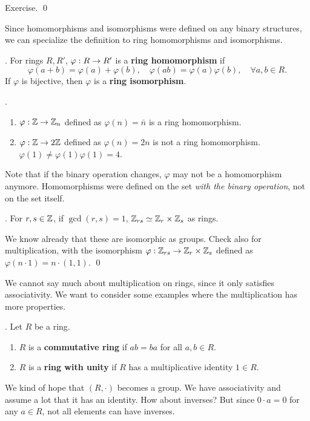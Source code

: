 \pf Exercise. \qed

Since homomorphisms and isomorphisms were defined on any binary structures, we can specialize the definition to ring homomorphisms and isomorphisms.

. For rings \(R, R'\), \(\varphi: R \rightarrow R'\) is a \textbf{ring homomorphism} if
\[
    \varphi(a + b) = \varphi(a) + \varphi(b), \quad \varphi(ab) = \varphi(a)\varphi(b), \quad \forall a, b \in R.
\]
If \(\varphi\) is bijective, then \(\varphi\) is a \textbf{ring isomorphism}.

\ex.
\begin{enumerate}
    \item \(\varphi: \mathbb{Z} \rightarrow \mathbb{Z}_n\) defined as \(\varphi(n) = \bar{n}\) is a ring homomorphism.
    \item \(\varphi: \mathbb{Z} \rightarrow 2\mathbb{Z}\) defined as \(\varphi(n) = 2n\) is not a ring homomorphism. \(\varphi(1) \neq \varphi(1) \varphi(1) = 4\).
\end{enumerate}

\rmk Note that if the binary operation changes, \(\varphi\) may not be a homomorphism anymore. Homomorphisms were defined on the set \textit{with the binary operation}, not on the set itself.

\prop. For \(r, s \in \mathbb{Z}\), if \(\gcd(r, s) = 1\), \(\mathbb{Z}_{rs} \simeq \mathbb{Z}_r \times \mathbb{Z}_s\) as rings.

\pf We know already that these are isomorphic as groups. Check also for multiplication, with the isomorphism \(\varphi: \mathbb{Z}_{rs} \rightarrow \mathbb{Z}_r \times \mathbb{Z}_s\) defined as \(\varphi(n \cdot 1) = n \cdot (1, 1)\). \qed

We cannot say much about multiplication on rings, since it only satisfies associativity. We want to consider some examples where the multiplication has more properties.

. Let \(R\) be a ring.
\begin{enumerate}
    \item {} \(R\) is a \textbf{commutative ring} if \(ab = ba\) for all \(a, b \in R\).
    \item {} \(R\) is a \textbf{ring with unity} if \(R\) has a multiplicative identity \(1\in R\).
\end{enumerate}

We kind of hope that \((R, \cdot)\) becomes a group. We have associativity and assume a lot that it has an identity. How about inverses? But since \(0 \cdot a = 0\) for any \(a \in R\), not all elements can have inverses.

